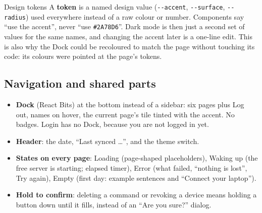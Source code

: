 \documentclass[11pt,a4paper]{article}
\begin{document}
\begin{concept}{Design tokens}
A \textbf{token} is a named design value (\texttt{-{}-accent}, \texttt{-{}-surface},
\texttt{-{}-radius}) used everywhere instead of a raw colour or number. Components say ``use the
accent'', never ``use \texttt{\#2A78D6}''. Dark mode is then just a second set of values for the
same names, and changing the accent later is a one-line edit. This is also why the Dock could be
recoloured to match the page without touching its code: its colours were pointed at the page's
tokens.
\end{concept}

\subsection{Navigation and shared parts}
\begin{itemize}[nosep]
  \item \textbf{Dock} (React Bits) at the bottom instead of a sidebar: six pages plus Log out,
        names on hover, the current page's tile tinted with the accent. No badges. Login has no
        Dock, because you are not logged in yet.
  \item \textbf{Header}: the date, ``Last synced \ldots'', and the theme switch.
  \item \textbf{States on every page}: Loading (page-shaped placeholders), Waking up (the free
        server is starting; elapsed timer), Error (what failed, ``nothing is lost'', Try again),
        Empty (first day: example sentences and ``Connect your laptop'').
  \item \textbf{Hold to confirm}: deleting a command or revoking a device means holding a button
        down until it fills, instead of an ``Are you sure?'' dialog.
\end{itemize}
\end{document}
